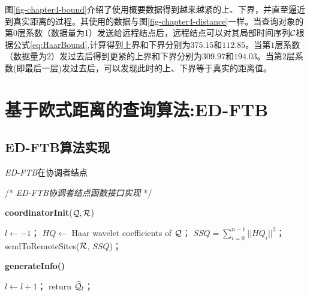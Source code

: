 图\ref{fig-chapter4-bound}介绍了使用概要数据得到越来越紧的上、下界，并直至逼近到真实距离的过程。其使用的数据与图\ref{fig-chapter4-distance}一样。当查询对象的第$0$层系数（数据量为1）发送给远程结点后，远程结点可以对其局部时间序列$\cal C$根据公式\ref{eq:HaarBound},计算得到上界和下界分别为$375.15$和$112.85$。当第$1$层系数（数据量为2）发过去后得到更紧的上界和下界分别为$309.97$和$194.03$。当第$2$层系数(即最后一层)发过去后，可以发现此时的上、下界等于真实的距离值。

 \section{基于欧式距离的查询算法:ED-FTB}\label{sec-c4-algorithm}
 \subsection{ED-FTB算法实现}
\begin{algorithm}[t]
	\renewcommand{\baselinestretch}{1}
	\caption{{\sl ED-FTB}\label{alg:EDCoordinator}在协调者结点}
	\begin{algorithmic}[2]
		\STATE /* \emph{ED-FTB协调者结点函数接口实现} */
	\end{algorithmic}
	\textbf{coordinatorInit}(${\cal Q} ,  {\cal R}$)
	\begin{algorithmic}[1]
		\STATE  $l\leftarrow -1$；
		\STATE $HQ \leftarrow$ Haar wavelet coefficients of $\cal Q$；
		\STATE $SSQ = \sum_{i=0}^{n-1}||HQ_{i}||^2$；
		\STATE 	\textsf{sendToRemoteSites}(${\cal R}$, $SSQ$)；
	\end{algorithmic}
	
	\textbf{generateInfo()}
	\begin{algorithmic}[1]
		\STATE $l\leftarrow l+1$；
		\STATE return $\widehat {\cal Q}_{l}$；
	\end{algorithmic}
\end{algorithm}

